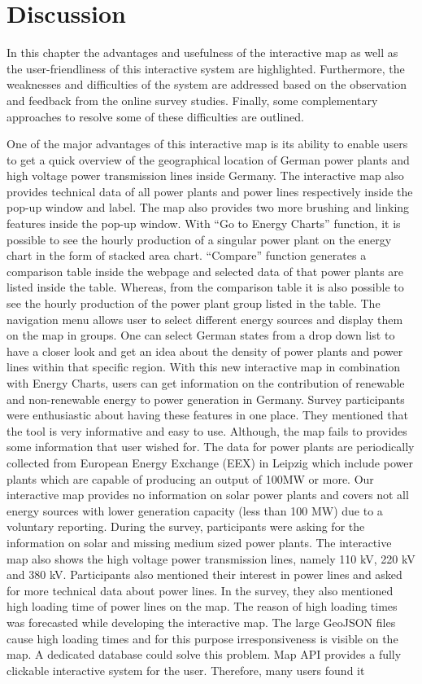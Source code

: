 \chapter{Discussion}
\label{chap:discussion}

In this chapter the advantages and usefulness of the interactive map as well as the user-friendliness of this interactive system are highlighted. Furthermore, the weaknesses and difficulties of the system are addressed based on the observation and feedback from the online survey studies. Finally, some complementary approaches to resolve some of these difficulties are outlined.

One of the major advantages of this interactive map is its ability to enable users to get a quick overview of the geographical location of German power plants and high voltage power transmission lines inside Germany.  The interactive map also provides technical data of all power plants and power lines respectively inside the pop-up window and label. The map also provides two more brushing and linking features inside the pop-up window. With “Go to Energy Charts” function, it is possible to see the hourly production of a singular power plant on the energy chart in the form of stacked area chart. “Compare” function generates a comparison table inside the webpage and selected data of that power plants are listed inside the table. Whereas, from the comparison table it is also possible to see the hourly production of the power plant group listed in the table. The navigation menu allows user to select different energy sources and display them on the map in groups. One can select German states from a drop down list to have a closer look and get an idea about the density of power plants and power lines within that specific region. With this new interactive map in combination with Energy Charts, users can get information on the contribution of renewable and non-renewable energy to power generation in Germany. Survey participants were enthusiastic about having these features in one place. They mentioned that the tool is very informative and easy to use. Although, the map fails to provides some information that user wished for. The data for power plants are periodically collected from European Energy Exchange (EEX) in Leipzig which include power plants which are capable of producing an output of 100MW or more. Our interactive map provides no information on solar power plants and covers not all energy sources with lower generation capacity (less than 100 MW) due to a voluntary reporting. During the survey, participants were asking for the information on solar and missing medium sized power plants. The interactive map also shows the high voltage power transmission lines, namely 110 kV, 220 kV and 380 kV. Participants also mentioned their interest in power lines and asked for more technical data about power lines. In the survey, they also mentioned high loading time of power lines on the map. The reason of high loading times was forecasted while developing the interactive map. The large GeoJSON files cause high loading times and for this purpose irresponsiveness is visible on the map. A dedicated database could solve this problem. Map API provides a fully clickable interactive system for the user. Therefore, many users found it 